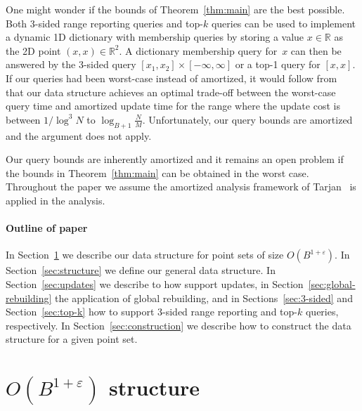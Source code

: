 \documentclass[11pt]{article}
\begin{document}
One might wonder if the bounds of Theorem~\ref{thm:main} are the best
possible.  Both 3-sided range reporting queries and top-$k$ queries
can be used to implement a dynamic 1D dictionary with membership
queries by storing a value $x\in\mathbb{R}$ as the 2D point
$(x,x)\in\mathbb{R}^2$. A dictionary membership query for~$x$ can then
be answered by the 3-sided query $[x_1,x_2]\times[-\infty,\infty]$ or
a top-1 query for $[x,x]$. If our queries had been worst-case instead
of amortized, it would follow from~\cite{soda03bf} that our data
structure achieves an optimal trade-off between the worst-case query
time and amortized update time for the range where the update cost is
between $1/\log^3 N$ to $\log_{B+1} \frac{N}{M}$. Unfortunately, our
query bounds are amortized and the argument does not apply.

Our query bounds are inherently amortized and it remains an open
problem if the bounds in Theorem~\ref{thm:main} can be obtained in the
worst case.  Throughout the paper we assume the amortized analysis
framework of Tarjan~\cite{tarjan85} is applied in the analysis.

\paragraph*{Outline of paper}

In Section~\ref{sec:child-structure} we describe our data structure
for point sets of size $O(B^{1+\varepsilon})$. In
Section~\ref{sec:structure} we define our general data structure. In
Section~\ref{sec:updates} we describe to how support updates, in
Section~\ref{sec:global-rebuilding} the application of global
rebuilding, and in Sections~\ref{sec:3-sided} and
Section~\ref{sec:top-k} how to support 3-sided range reporting and
top-$k$ queries, respectively. In Section~\ref{sec:construction} we
describe how to construct the data structure for a given point set.

\section{$O(B^{1+\varepsilon})$ structure}
\label{sec:child-structure}
\end{document}
